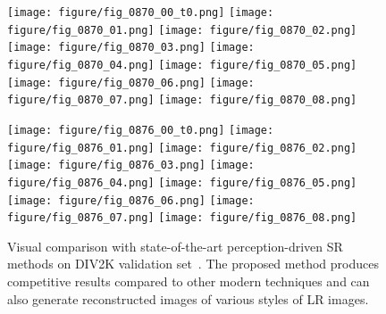 \documentclass{article}
\begin{document}
\begin{figure*}[!t]
\begin{minipage}[t]{1.0\linewidth}
    \texttt{[image: figure/fig\_0870\_00\_t0.png]}\hfill
    \texttt{[image: figure/fig\_0870\_01.png]}\hfill
    \texttt{[image: figure/fig\_0870\_02.png]}\hfill
    \texttt{[image: figure/fig\_0870\_03.png]}\hfill
    \texttt{[image: figure/fig\_0870\_04.png]}\hfill
    \texttt{[image: figure/fig\_0870\_05.png]}\hfill
    \texttt{[image: figure/fig\_0870\_06.png]}\hfill
    \texttt{[image: figure/fig\_0870\_07.png]}\hfill
    \texttt{[image: figure/fig\_0870\_08.png]}\vfill
    \vspace{0.1cm}
    
    \texttt{[image: figure/fig\_0876\_00\_t0.png]}\hfill
    \texttt{[image: figure/fig\_0876\_01.png]}\hfill
    \texttt{[image: figure/fig\_0876\_02.png]}\hfill
    \texttt{[image: figure/fig\_0876\_03.png]}\hfill
    \texttt{[image: figure/fig\_0876\_04.png]}\hfill
    \texttt{[image: figure/fig\_0876\_05.png]}\hfill
    \texttt{[image: figure/fig\_0876\_06.png]}\hfill
    \texttt{[image: figure/fig\_0876\_07.png]}\hfill
    \texttt{[image: figure/fig\_0876\_08.png]}\vfill

\end{minipage}
\caption{Visual comparison with state-of-the-art perception-driven SR methods on DIV2K validation set~\cite{agustsson2017ntire}. The proposed method produces competitive results compared to other modern techniques and can also generate reconstructed images of various styles of LR images.}
\label{fig:fig_comp_4x}
\end{figure*}
\end{document}
